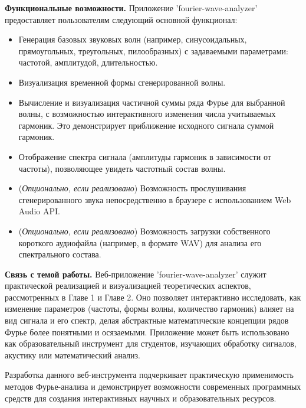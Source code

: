 \documentclass[bachelor, och, diploma]{SCWorks}
\begin{document}
\textbf{Функциональные возможности.} Приложение 'fourier-wave-analyzer' предоставляет пользователям следующий основной функционал:
\begin{itemize}
    \item Генерация базовых звуковых волн (например, синусоидальных, прямоугольных, треугольных, пилообразных) с задаваемыми параметрами: частотой, амплитудой, длительностью.
    \item Визуализация временной формы сгенерированной волны.
    \item Вычисление и визуализация частичной суммы ряда Фурье для выбранной волны, с возможностью интерактивного изменения числа учитываемых гармоник. Это демонстрирует приближение исходного сигнала суммой гармоник.
    \item Отображение спектра сигнала (амплитуды гармоник в зависимости от частоты), позволяющее увидеть частотный состав волны.
    \item (\textit{Опционально, если реализовано}) Возможность прослушивания сгенерированного звука непосредственно в браузере с использованием Web Audio API.
    \item (\textit{Опционально, если реализовано}) Возможность загрузки собственного короткого аудиофайла (например, в формате WAV) для анализа его спектрального состава.
\end{itemize}

\textbf{Связь с темой работы.} Веб-приложение 'fourier-wave-analyzer' служит практической реализацией и визуализацией теоретических аспектов, рассмотренных в Главе 1 и Главе 2. Оно позволяет интерактивно исследовать, как изменение параметров (частоты, формы волны, количество гармоник) влияет на вид сигнала и его спектр, делая абстрактные математические концепции рядов Фурье более понятными и осязаемыми. Приложение может быть использовано как образовательный инструмент для студентов, изучающих обработку сигналов, акустику или математический анализ.

Разработка данного веб-инструмента подчеркивает практическую применимость методов Фурье-анализа и демонстрирует возможности современных программных средств для создания интерактивных научных и образовательных ресурсов.

\end{document}
